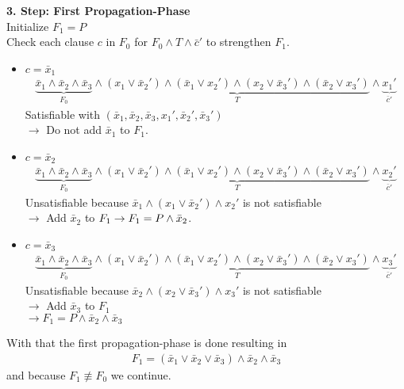 \documentclass[11pt, a4paper, BCOR=10mm, ngerman, oneside]{scrbook}
\begin{document}
\textbf{3. Step: First Propagation-Phase} \\
Initialize $F_1 = P$ \\
Check each clause $c$ in $F_0$ for $F_0 \land T \land \bar c'$ to strengthen $F_1$.
\begin{itemize}
\item $c = \bar x_1$
\begin{align*}
\underbrace{\bar x_1 \land \bar x_2 \land \bar x_3}_{F_0} \land \underbrace{(x_1 \lor \bar x_2' ) \land ( \bar x_1 \lor x_2') \land (x_2 \lor \bar x_3') \land ( \bar x_2 \lor x_3')}_{T} \land \underbrace{x_1'}_{\bar c'}
\end{align*}
Satisfiable with $(\bar x_1, \bar x_2, \bar x_3, x_1', \bar x_2', \bar x_3')$ \\ 
$\rightarrow$ Do not add $\bar x_1$ to $F_1$. \\

\item $c = \bar x_2$
\begin{align*}
\underbrace{\bar x_1 \land \bar x_2 \land \bar x_3}_{F_0} \land \underbrace{(x_1 \lor \bar x_2' ) \land ( \bar x_1 \lor x_2') \land (x_2 \lor \bar x_3') \land ( \bar x_2 \lor x_3')}_{T} \land \underbrace{x_2'}_{\bar c'}
\end{align*}
Unsatisfiable because $\bar x_1 \land (x_1 \lor \bar x_2') \land x_2'$ is not satisfiable \\ $\rightarrow$ Add $\bar x_2$ to $F_1 \\ \rightarrow F_1 = P \land \bar x_2$. \\

\item $c = \bar x_3$
\begin{align*}
\underbrace{\bar x_1 \land \bar x_2 \land \bar x_3}_{F_0} \land \underbrace{(x_1 \lor \bar x_2' ) \land ( \bar x_1 \lor x_2') \land (x_2 \lor \bar x_3') \land ( \bar x_2 \lor x_3')}_{T} \land \underbrace{x_3'}_{\bar c'}
\end{align*}
Unsatisfiable because $\bar x_2 \land (x_2 \lor \bar x_3') \land x_3'$ is not satisfiable \\ $\rightarrow$ Add $\bar x_3$ to $F_1$ \\ $\rightarrow F_1 = P \land \bar x_2 \land \bar x_3$
\end{itemize}
With that the first propagation-phase is done resulting in 
\begin{align*}
 F_1 = (\bar x_1 \lor \bar x_2 \lor \bar x_3) \land \bar x_2 \land \bar x_3
\end{align*}
and because $F_1 \not\equiv F_0$ we continue. \\ \\ \\
\end{document}
